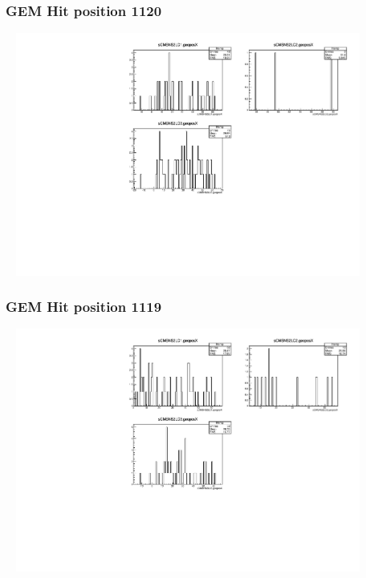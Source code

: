 \documentclass[slidestop,compress,mathserif]{beamer}
\begin{document}
\begin{frame}\frametitle{GEM Hit position 1120}
	 \includegraphics[width=12cm,height=8cm]{GEM_Hit_position_1120.pdf}
\end{frame}
\begin{frame}\frametitle{GEM Hit position 1119}
	 \includegraphics[width=12cm,height=8cm]{GEM_Hit_position_1119.pdf}
\end{frame}
\end{document}
